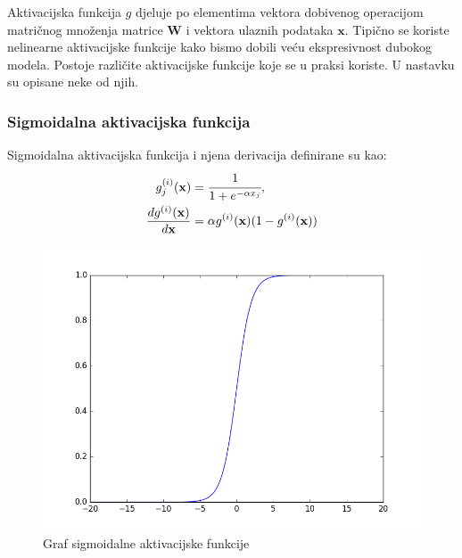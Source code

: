 \documentclass[times, utf8, diplomski, numeric]{fer}
\begin{document}
Aktivacijska funkcija $g$ djeluje po elementima vektora dobivenog operacijom matričnog množenja matrice $\mathbf{W}$ i vektora ulaznih podataka $\mathbf{x}$.
Tipično se koriste nelinearne aktivacijske funkcije kako bismo dobili veću ekspresivnost dubokog modela.
Postoje različite aktivacijske funkcije koje se u praksi koriste. U nastavku su opisane neke od njih.

\subsubsection{Sigmoidalna aktivacijska funkcija}
Sigmoidalna aktivacijska funkcija i njena derivacija definirane su kao: 
\begin{align}
 g^{(i)}_j(\mathbf{x})&=\cfrac{1}{1+e^{-\alpha x_j}}, \\
 \frac{dg^{(i)}(\mathbf{x})}{d\mathbf{x}}&=\alpha g^{(i)}(\mathbf{x}) (1-g^{(i)}(\mathbf{x})) \label{eq:sigmoid_derivative}
\end{align}

\begin{figure}[H]
\centering
\includegraphics[scale=0.5]{images/sigmoid_graph.png}
\caption{Graf sigmoidalne aktivacijske funkcije}
\label{img:sigmoid_graph}
\end{figure}
\end{document}
